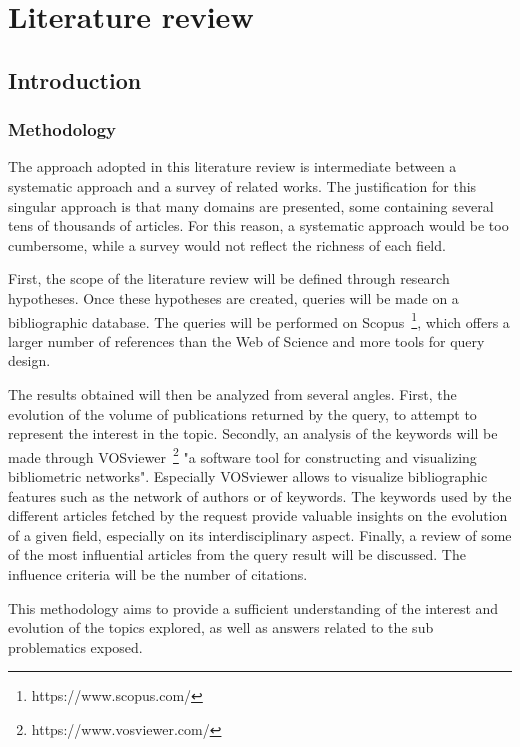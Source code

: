 \chapter{Literature review}

\section*{Introduction}
\subsection*{Methodology}
The approach adopted in this literature review is intermediate between a systematic approach and a survey of related works.
The justification for this singular approach is that many domains are presented, some containing several tens of thousands of articles.
For this reason, a systematic approach would be too cumbersome, while a survey would not reflect the richness of each field.

First, the scope of the literature review will be defined through research hypotheses.
Once these hypotheses are created, queries will be made on a bibliographic database.
The queries will be performed on Scopus~\footnote{https://www.scopus.com/}, which offers a larger number of references than the Web of Science and more tools for query design.

The results obtained will then be analyzed from several angles.
First, the evolution of the volume of publications returned by the query, to attempt to represent the interest in the topic.
Secondly, an analysis of the keywords will be made through VOSviewer~\footnote{https://www.vosviewer.com/} "a software tool for constructing and visualizing bibliometric networks".
Especially VOSviewer allows to visualize bibliographic features such as the network of authors or of keywords.
The keywords used by the different articles fetched by the request provide valuable insights on the evolution of a given field, especially on its interdisciplinary aspect.
Finally, a review of some of the most influential articles from the query result will be discussed.
The influence criteria will be the number of citations.

This methodology aims to provide a sufficient understanding of the interest and evolution of the topics explored, as well as answers related to the sub problematics exposed.

